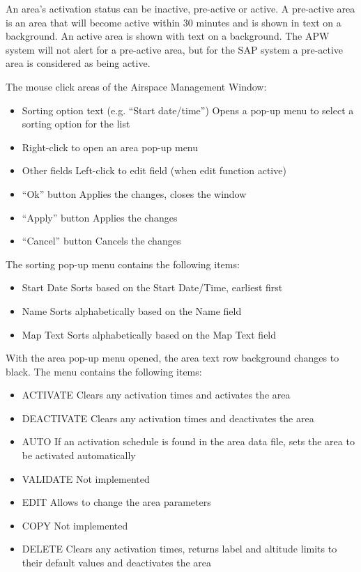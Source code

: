 \documentclass[a4paper,oneside,11pt]{memoir}
\begin{document}
\bigskip

An area’s activation status can be inactive, pre-active or active. A pre-active area is an area that will become active within 30 minutes and is shown in  text on a  background. An active area is shown with  text on a  background. The APW system will not alert for a pre-active area, but for the SAP system a pre-active area is considered as being active.

\bigskip

The mouse click areas of the Airspace Management Window:


\begin{itemize} 
        \item Sorting option text (e.g. “Start date/time”) Opens a pop-up menu to select a sorting option for the list 
        \item Right-click to open an area pop-up menu
        \item Other fields Left-click to edit field (when edit function active)
        \item “Ok” button Applies the changes, closes the window
        \item “Apply” button Applies the changes
        \item “Cancel” button Cancels the changes 
\end{itemize}

\bigskip

The sorting pop-up menu contains the following items:

\begin{itemize}
        \item Start Date Sorts based on the Start Date/Time, earliest first
        \item Name Sorts alphabetically based on the Name field
        \item Map Text Sorts alphabetically based on the Map Text field 
\end{itemize}

\bigskip

With the area pop-up menu opened, the area text row background changes to black. The menu contains the following items:

\begin{itemize}
        \item ACTIVATE Clears any activation times and activates the area
        \item DEACTIVATE Clears any activation times and deactivates the area
        \item AUTO If an activation schedule is found in the area data file, sets the area to be activated automatically
        \item VALIDATE Not implemented
        \item EDIT Allows to change the area parameters
        \item COPY Not implemented
        \item DELETE Clears any activation times, returns label and altitude limits to their default values and deactivates the area
\end{itemize}
\end{document}
